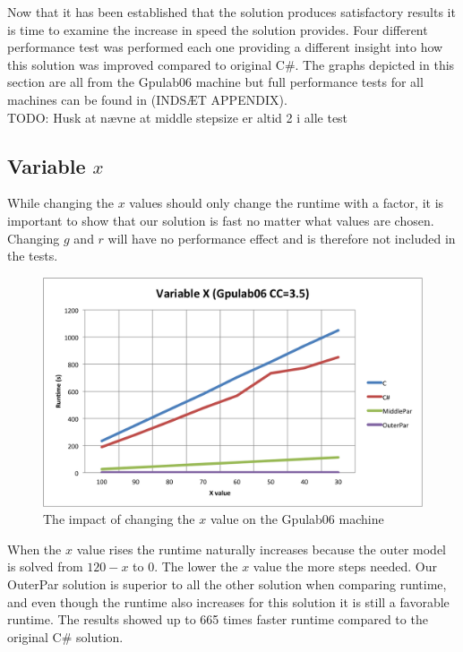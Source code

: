 
Now that it has been established that the solution produces satisfactory results it is time to examine the increase in speed the solution provides. Four different performance test was performed each one providing a different insight into how this solution was improved compared to original C\#. The graphs depicted in this section are all from the Gpulab06 machine but full performance tests for all machines can be found in (INDSÆT APPENDIX). \\

TODO: Husk at nævne at middle stepsize er altid 2 i alle test

\subsection{Variable $x$}
While changing the $x$ values should only change the runtime with a factor, it is important to show that our solution is fast no matter what values are chosen. Changing $g$ and $r$ will have no performance effect and is therefore not included in the tests.

\begin{figure}
\begin{center}
	\includegraphics[width=\textwidth]{img/Gpulab-varx35.png}
\end{center}
\caption{The impact of changing the $x$ value on the Gpulab06 machine}
\end{figure}

When the $x$ value rises the runtime naturally increases because the outer model is solved from $120-x$ to 0. The lower the $x$ value the more steps needed. Our OuterPar solution is superior to all the other solution when comparing runtime, and even though the runtime also increases for this solution it is still a favorable runtime. The results showed up to 665 times faster runtime compared to the original C\# solution.

